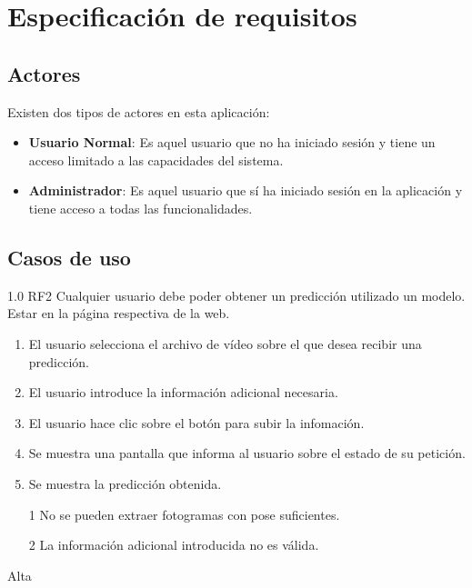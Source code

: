 \section{Especificación de requisitos}

\subsection{Actores}

Existen dos tipos de actores en esta aplicación:

\begin{itemize}
    \item \textbf{Usuario Normal}: Es aquel usuario que no ha iniciado sesión y
          tiene un acceso limitado a las capacidades del sistema.
    \item \textbf{Administrador}: Es aquel usuario que sí ha iniciado sesión en
          la aplicación y tiene acceso a todas las funcionalidades.
\end{itemize}

\subsection{Casos de uso}


{1.0}
{RF2}
{Cualquier usuario debe poder obtener un predicción utilizado un modelo.}
{Estar en la página respectiva de la web.}
{
    \begin{enumerate}
        \def\labelenumi{\arabic{enumi}.}
        \tightlist
        \item El usuario selecciona el archivo de vídeo sobre el que desea
              recibir una predicción.
        \item El usuario introduce la información adicional necesaria.
        \item El usuario hace clic sobre el botón para subir la infomación.
        \item Se muestra una pantalla que informa al usuario sobre el estado de
              su petición.
        \item Se muestra la predicción obtenida.
    \end{enumerate}
}
{}
{
    \begin{itemize}
        \item [1] No se pueden extraer fotogramas con pose suficientes.
        \item [2] La información adicional introducida no es válida.
    \end{itemize}
}
{Alta}

